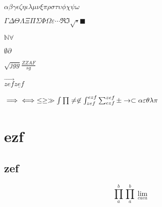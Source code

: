 \documentclass[a4paper]{article}
\begin{document}
\color{black}
$\alpha \beta \gamma \epsilon \zeta \eta \iota \lambda \mu \nu \xi \pi \rho \sigma \tau 
\upsilon \phi \chi \psi \omega $

$\Gamma \Delta \Theta \Lambda \Xi \Pi \Sigma \Phi \Omega \varepsilon \cdots \Re \Im \surd \square \blacksquare$

$\mathbb{N} \forall $

$\emptyset \partial $

$\sqrt{jgg} \frac{ZZAF}{sg} $

$\overrightarrow{zef} \underline{zef} $

$\implies \iff \leq \geq \gg \int \prod \neq \not \in \int_{zef}^{ezf} \sum_{ezf}^{zef} \pm \to \subset\alpha \varepsilon \theta \lambda \pi \color{black} \color{red} \color{blue} $
\section{ezf} 
\subsection{zef}

$$\prod_{a}^{b} \prod\limits_{a}^{b} \lim_{caca} $$
\end{document}
